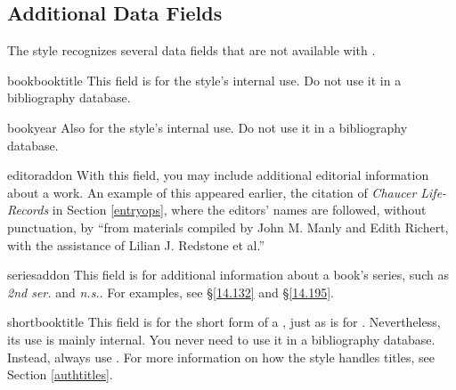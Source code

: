 \documentclass[11pt,letterpaper,oneside]{article}
\begin{document}
\subsection{Additional Data Fields}
\label{datafields}

The style recognizes several data fields that are not available with
\biblatex.

\begin{marglist}

\item[bookbooktitle] This field is for the style's internal use. Do
not use it in a bibliography database.

\item[bookyear] Also for the style's internal use. Do not use it in a
bibliography database.

\item[editoraddon] With this field, you may include additional
editorial information about a work. An example of this appeared
earlier, the citation of \textit{Chaucer Life-Records} in Section
\ref{entryops}, where the editors' names are followed, without
punctuation, by ``from materials compiled by John M. Manly and Edith
Richert, with the assistance of Lilian J. Redstone et al.''


\item[seriesaddon] This field is for additional information about a
book's series, such as \textit{2nd ser.} and \textit{n.s.}. For
examples, see \S\ref{14.132} and \S\ref{14.195}.

\item[shortbooktitle] This field is for the short form of a
, just as  is for
. Nevertheless, its use is mainly internal. You never
need to use it in a bibliography database. Instead, always use
. For more information on how the style handles
titles, see Section \ref{authtitles}.



\end{marglist}
\end{document}
